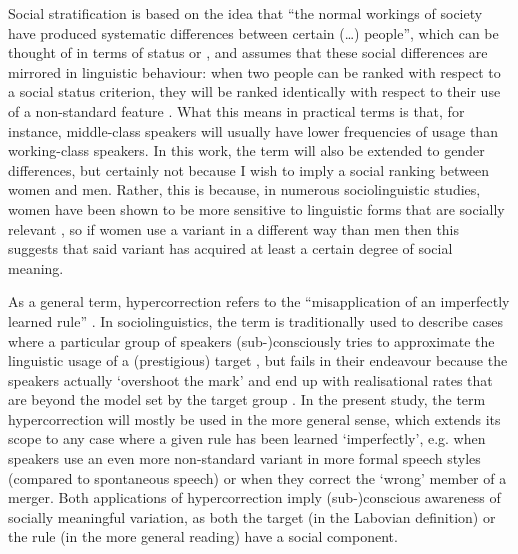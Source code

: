 Social stratification is based on the idea that ``the normal workings of society have produced systematic differences between certain (\ldots) people'', which can be thought of in terms of status or , and assumes that these social differences are mirrored in linguistic behaviour: when two people can be ranked with respect to a social status criterion, they will be ranked identically with respect to their use of a non-standard feature \parencite[44--45]{labov1972}.
What this means in practical terms is that, for instance, middle-class speakers will usually have lower frequencies of usage than working-class speakers.
In this work, the term will also be extended to gender differences, but certainly not because I wish to imply a social ranking between women and men.
Rather, this is because, in numerous sociolinguistic studies, women have been shown to be more sensitive to linguistic forms that are socially relevant \parencite[cf.][290--291]{labov2001a}, so if women use a variant in a different way than men then this suggests that said variant has acquired at least a certain degree of social meaning.

As a general term, hypercorrection refers to the ``misapplication of an imperfectly learned rule'' \parencite[126]{labov1972}.
In sociolinguistics, the term is traditionally used to describe cases where a particular group of speakers (sub-)consciously tries to approximate the linguistic usage of a (prestigious) target , but fails in their endeavour because the speakers actually `overshoot the mark' and end up with realisational rates that are beyond the model set by the target group \parencite[cf.][126]{labov1972}.
In the present study, the term hypercorrection will mostly be used in the more general sense, which extends its scope to any case where a given rule has been learned `imperfectly', e.g. when speakers use an even more non-standard variant in more formal speech styles (compared to spontaneous speech) or when they correct the `wrong' member of a merger.
Both applications of hypercorrection imply (sub-)conscious awareness of socially meaningful variation, as both the target (in the Labovian definition) or the rule (in the more general reading) have a social component.

